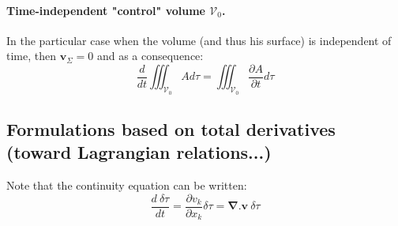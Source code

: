 \paragraph{Time-independent "control" volume $\mathcal{V}_0$.} 
In the particular case when the volume (and thus his surface) is independent of time, then $  \mathbf{v}_{\Sigma}=0$ and as a consequence:
\begin{equation}
 \displaystyle
 	\frac{d}{dt}\iiint_{\mathcal{V}_0} A d\tau = \iiint_{\mathcal{V}_0}\frac{\partial A}{\partial t} d\tau
\end{equation}

\subsection{Formulations based on total derivatives (toward Lagrangian relations...)}
Note that the continuity equation can be written:
\begin{equation}
	\displaystyle
	\frac{d\ \delta \tau}{dt}=\frac{\partial v_{k}}{\partial x_k} \delta\tau= \mathbf{\nabla}.\mathbf{v}\ \delta\tau
\end{equation}

